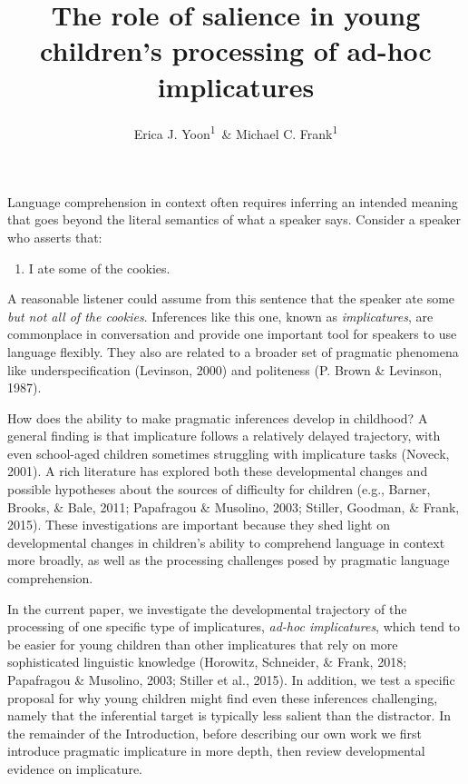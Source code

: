 \documentclass[mask,man]{apa6}
\title{The role of salience in young children's processing of ad-hoc
implicatures}
\author{Erica J. Yoon\textsuperscript{1}~\& Michael C. Frank\textsuperscript{1}}
\affiliation{
    \vspace{0.5cm}
          \textsuperscript{1} Stanford University  }
\providecommand{\tightlist}{%
  \setlength{\itemsep}{0pt}\setlength{\parskip}{0pt}}
\begin{document}
\maketitle

\setcounter{secnumdepth}{0}



Language comprehension in context often requires inferring an intended
meaning that goes beyond the literal semantics of what a speaker says.
Consider a speaker who asserts that:

\begin{enumerate}
\def\labelenumi{(\arabic{enumi})}
\tightlist
\item
  I ate some of the cookies.
\end{enumerate}

\noindent A reasonable listener could assume from this sentence that the
speaker ate some \emph{but not all of the cookies}. Inferences like this
one, known as \emph{implicatures}, are commonplace in conversation and
provide one important tool for speakers to use language flexibly. They
also are related to a broader set of pragmatic phenomena like
underspecification (Levinson, 2000) and politeness (P. Brown \&
Levinson, 1987).

How does the ability to make pragmatic inferences develop in childhood?
A general finding is that implicature follows a relatively delayed
trajectory, with even school-aged children sometimes struggling with
implicature tasks (Noveck, 2001). A rich literature has explored both
these developmental changes and possible hypotheses about the sources of
difficulty for children (e.g., Barner, Brooks, \& Bale, 2011; Papafragou
\& Musolino, 2003; Stiller, Goodman, \& Frank, 2015). These
investigations are important because they shed light on developmental
changes in children's ability to comprehend language in context more
broadly, as well as the processing challenges posed by pragmatic
language comprehension.

In the current paper, we investigate the developmental trajectory of the
processing of one specific type of implicatures, \emph{ad-hoc
implicatures}, which tend to be easier for young children than other
implicatures that rely on more sophisticated linguistic knowledge
(Horowitz, Schneider, \& Frank, 2018; Papafragou \& Musolino, 2003;
Stiller et al., 2015). In addition, we test a specific proposal for why
young children might find even these inferences challenging, namely that
the inferential target is typically less salient than the distractor. In
the remainder of the Introduction, before describing our own work we
first introduce pragmatic implicature in more depth, then review
developmental evidence on implicature.
\end{document}
